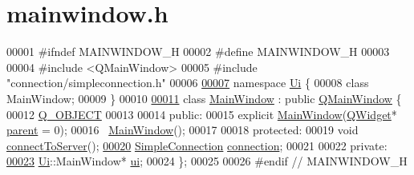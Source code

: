 \hypertarget{a00083_source}{}\section{mainwindow.\+h}
\label{a00083_source}

\begin{DoxyCode}
00001 \textcolor{preprocessor}{#}\textcolor{preprocessor}{ifndef} \textcolor{preprocessor}{MAINWINDOW\_H}
00002 \textcolor{preprocessor}{#}\textcolor{preprocessor}{define} \textcolor{preprocessor}{MAINWINDOW\_H}
00003 
00004 \textcolor{preprocessor}{#}\textcolor{preprocessor}{include} \textcolor{preprocessor}{<}\textcolor{preprocessor}{QMainWindow}\textcolor{preprocessor}{>}
00005 \textcolor{preprocessor}{#}\textcolor{preprocessor}{include} \textcolor{preprocessor}{"connection/simpleconnection.h"}
00006 
\hyperlink{a00113}{00007} \textcolor{keyword}{namespace} \hyperlink{a00113}{Ui} \{
00008 \textcolor{keyword}{class} MainWindow;
00009 \}
00010 
\hyperlink{a00177}{00011} \textcolor{keyword}{class} \hyperlink{a00177_a8b244be8b7b7db1b08de2a2acb9409db}{MainWindow} : \textcolor{keyword}{public} \hyperlink{a00177_a8b244be8b7b7db1b08de2a2acb9409db}{QMainWindow} \{
00012   \hyperlink{a00177_a8b244be8b7b7db1b08de2a2acb9409db}{Q\_OBJECT}
00013 
00014  \textcolor{keyword}{public}:
00015   \textcolor{keyword}{explicit} \hyperlink{a00177_a8b244be8b7b7db1b08de2a2acb9409db}{MainWindow}(\hyperlink{a00177_a8b244be8b7b7db1b08de2a2acb9409db}{QWidget}* \hyperlink{a00177_a8b244be8b7b7db1b08de2a2acb9409db}{parent} = 0);
00016   ~\hyperlink{a00177_ae98d00a93bc118200eeef9f9bba1dba7}{MainWindow}();
00017 
00018  \textcolor{keyword}{protected}:
00019   \textcolor{keywordtype}{void} \hyperlink{a00177_abfedef9edae209df536e8c1c7cf0e7ae}{connectToServer}();
\hyperlink{a00177_a8235680bc39bc64e5686dfcaccabf72f}{00020}   \hyperlink{a00125_a8360af71c89a54be93430b746d5fae08}{SimpleConnection} \hyperlink{a00177_a8235680bc39bc64e5686dfcaccabf72f}{connection};
00021 
00022  \textcolor{keyword}{private}:
\hyperlink{a00177_a35466a70ed47252a0191168126a352a5}{00023}   \hyperlink{a00113}{Ui}::MainWindow* \hyperlink{a00177_a35466a70ed47252a0191168126a352a5}{ui};
00024 \};
00025 
00026 \textcolor{preprocessor}{#}\textcolor{preprocessor}{endif}  \textcolor{comment}{// MAINWINDOW\_H}
\end{DoxyCode}
